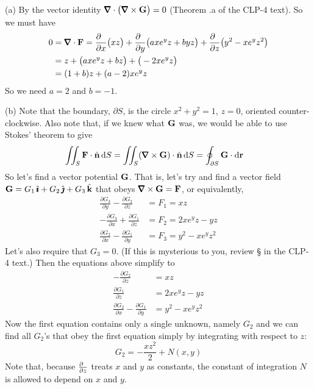 \begin{solution}
(a)
By the vector identity $\vnabla\cdot\big(\vnabla\times\vG\big)=0$ 
(Theorem .a of the CLP-4 text).
So we must have
\begin{align*}
0&=\vnabla\cdot\vF
  =\frac{\partial\hfill}{\partial x}\big(xz\big)
   + \frac{\partial\hfill}{\partial y}\big(axe^y z + byz\big)
   + \frac{\partial\hfill}{\partial z}\big(y^2 - xe^y z^2 \big) \\
 &= z + \big(axe^y z+bz\big) + \big(-2xe^yz\big) \\
 &= (1+b)z + (a-2)x e^y z
\end{align*}
So we need $a=2$ and $b=-1$.

(b)
Note that the boundary, $\partial S$, is the circle $x^2+y^2=1$, $z=0$,
oriented counter-clockwise. Also note that, if we knew what $\mathbf{G}$ was,
we would be able to use Stokes' theorem to give
\begin{align*}
\dblInt_S\vF\cdot\hn\,\dee{S}
&= \dblInt_S(\vnabla\times\vG)\cdot\hn\,\dee{S}
=\oint_{\partial S} \vG\cdot\dee{\vr}
\end{align*}
So let's find a vector potential $\mathbf{G}$.
That is, let's try and find a vector field 
$\mathbf{G}= G_1\,\hat{\pmb{\imath}} + G_2\,\hat{\pmb{\jmath}} + G_3\,\hat{\mathbf{k}}$ that obeys $\vnabla\times\vG = \vF$,
or equivalently,
\begin{align*}
\frac{\partial G_3}{\partial y} -\frac{\partial G_2}{\partial z} &= F_1 
         =xz\\
-\frac{\partial G_3}{\partial x} +\frac{\partial G_1}{\partial z}&=F_2
         =2xe^y z - yz \\
\frac{\partial G_2}{\partial x} -\frac{\partial G_1}{\partial y}&=F_3
         =y^2 - xe^y z^2
\end{align*}
Let's also require that $G_3=0$. (If this is mysterious to you,
review \S{} in the CLP-4 text.)
Then the equations above simplify to
 \begin{align*}
 -\frac{\partial G_2}{\partial z} &=xz\\
  \frac{\partial G_1}{\partial z} &=2xe^y z - yz \\
\frac{\partial G_2}{\partial x} -\frac{\partial G_1}{\partial y}&=y^2 - xe^y z^2
\end{align*}
Now  the first equation contains only a single unknown, namely $G_2$ and we 
can find all $G_2$'s that obey the first equation simply by integrating 
with respect to $z$:
\begin{equation*}
G_2 = -\frac{xz^2}{2} + N(x,y)
\end{equation*}
Note that, because $\frac{\partial\hfill}{\partial z}$ treats $x$ and $y$
as constants, the constant of integration $N$ is allowed to depend on $x$ 
and $y$. 


\end{solution}
